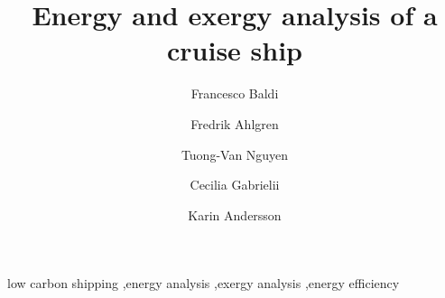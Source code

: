 \documentclass[preprint,12pt]{elsarticle}
\begin{document}
\begin{frontmatter}



\title{Energy and exergy analysis of a cruise ship}


\author[EPFL]{Francesco Baldi}
\author[Linnaeus]{Fredrik Ahlgren}
\author[DTU]{Tuong-Van Nguyen}
\author[CTU]{Cecilia Gabrielii}
\author[CTU]{Karin Andersson}

\address[EPFL]{Industrial Process Energy Systems Engineering (IPESE), \'{E}cole Polytechnique F\'{e}d\'{e}rale de Lausanne, 1950, Sion, Switzerland}
\address[Linnaeus]{Kalmar Maritime Academy, Linnaeus University, Kalmar, Sweden}
\address[DTU]{Department of Mechanical Engineering, Technical University of Denmark, Lyngby, Denmark}
\address[CTU]{Department of Mechanics and Maritime Sciences, Chalmers University of technology, Gothenburg, Sweden}

\begin{abstract}

\end{abstract}

\begin{keyword}



low carbon shipping \sep energy analysis \sep exergy analysis \sep energy efficiency

\end{keyword}

\end{frontmatter}
\end{document}
